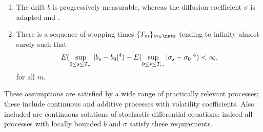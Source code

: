 \begin{ass}\label{as:vol}\mbox{} 
  \begin{enumerate}
    \item The drift $b$ is progressively measurable, whereas the diffusion coefficient $\sigma$  is adapted and \cadlag.
    \item There is a sequence of stopping times $\{T_m\}_{m \in \nats}$ tending to infinity almost surely such that   
      \begin{align}
       E( \sup_{0 \le  s \le T_m} \vert b_s  - b_0\vert^4) + E( \sup_{0 \le  s \le T_m} \vert \sigma_s  - \sigma_0\vert^4)< \infty,\notag
        \label{}
      \end{align}
      for all $m$. 
  \end{enumerate}
\end{ass}
\begin{remark}
  These assumptions are satisfied by a wide range of practically relevant processes; these  include  continuous \levy and additive  processes with \cadlag  volatility coefficients. Also included are  continuous solutions of stochastic differential equations; indeed  all processes with locally bounded $b$ and $\sigma$ satisfy these requirements. 
\end{remark}
